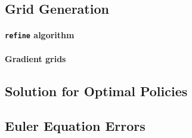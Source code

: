 
\blindtext{}



\subsection{Grid Generation}
\label{sec:826gridGeneration}

\paragraph{\texttt{refine} algorithm}



\blindtext{}

\begin{algorithm}
  \begin{algorithmic}[1]
      \EndFor{}
    \EndFunction{}
  \end{algorithmic}
  \caption[TODO]{%
    TODO%
  }%
  \label{alg:financeRefine}%
\end{algorithm}

\paragraph{Gradient grids}

\blindtext{}



\subsection{Solution for Optimal Policies}
\label{sec:827solvePolicy}

\blindtext{}



\subsection{Euler Equation Errors}
\label{sec:828eulerEquationErrors}

\blindtext{}

